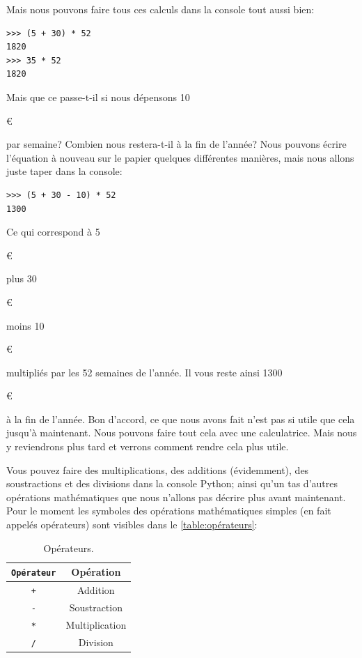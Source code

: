 Mais nous pouvons faire tous ces calculs dans la console tout aussi bien:

\begin{Verbatim}[frame=single,rulecolor=\color{mbleu}, label=à taper]
>>> (5 + 30) * 52
1820
>>> 35 * 52
1820
\end{Verbatim}


Mais que ce passe-t-il si nous dépensons 10\begin{small}\euro\end{small} par semaine? Combien nous restera-t-il à la fin de l'année? Nous pouvons écrire l'équation à nouveau sur le papier quelques différentes manières, mais nous allons juste taper dans la console:

\begin{Verbatim}[frame=single,rulecolor=\color{mbleu}, label=à taper]
>>> (5 + 30 - 10) * 52
1300
\end{Verbatim}


Ce qui correspond à 5\begin{small}\euro\end{small} plus 30\begin{small}\euro\end{small} moins 10\begin{small}\euro\end{small} multipliés par les 52 semaines de l'année. Il vous reste ainsi 1300\begin{small}\euro\end{small} à la fin de l'année. Bon d'accord, ce que nous avons fait n'est pas si utile que cela jusqu'à maintenant. Nous pouvons faire tout cela avec une calculatrice. Mais nous y reviendrons plus tard et verrons comment rendre cela plus utile.

Vous pouvez faire des multiplications, des additions (évidemment), des soustractions et des divisions dans la console Python; ainsi qu'un tas d'autres opérations mathématiques que nous n'allons pas décrire plus avant maintenant. Pour le moment les symboles des opérations mathématiques simples (en fait appelés opérateurs)  sont visibles dans le  \autoref{table:opérateurs}:


\begin{table}[h!]
\begin{center}
\begin{tabular}{|c|c|}
\hline
\texttt{Opérateur}&Opération\\
\hline
\texttt{+}&Addition\\
\hline
\texttt{-}&Soustraction\\
\hline
\texttt{*}&Multiplication\\
\hline
\texttt{/}&Division\\
\hline
\end{tabular}
\end{center}

\caption{Opérateurs.}\label{table:opérateurs}
\end{table}


